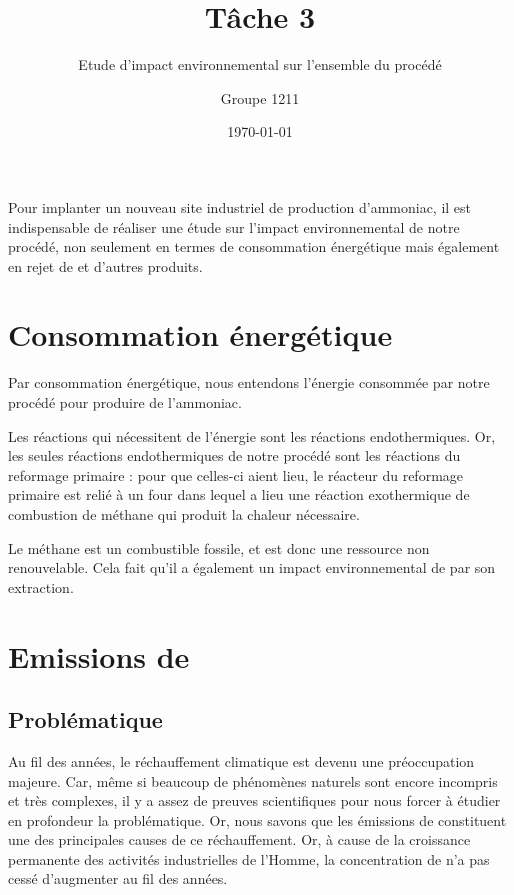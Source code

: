 \documentclass[a4paper, oneside]{scrartcl}
\begin{document}
\titlehead{}
\subject{}
\title{Tâche 3}
\subtitle{ Etude d’impact environnemental sur l’ensemble du procédé }
\author{Groupe 1211}
\publishers{}
\date{\today}

\dedication{}

\maketitle

Pour implanter un nouveau site industriel de production d'ammoniac, il est indispensable de réaliser une étude sur l'impact environnemental de notre procédé, non seulement en termes de consommation énergétique mais également en rejet de  et d'autres produits.

\section{Consommation énergétique}
Par consommation énergétique, nous entendons l'énergie consommée par notre procédé pour produire de l'ammoniac.
 

Les réactions qui nécessitent de l'énergie sont les réactions endothermiques. Or, les seules réactions endothermiques de notre procédé sont les réactions du reformage primaire : pour que celles-ci aient lieu, le réacteur du reformage primaire est relié à un four dans lequel a lieu une réaction exothermique de combustion de méthane qui produit la chaleur nécessaire.
 

Le méthane est un combustible fossile, et est donc une ressource non renouvelable. Cela fait qu'il a également un impact environnemental de par son extraction.

\section{Emissions de \texorpdfstring{}{CO \texttwoinferior}}
\subsection{Problématique \cite{prob1} \cite{changclim}}
Au fil des années, le réchauffement climatique est devenu une préoccupation majeure. Car, même si beaucoup de phénomènes naturels sont encore incompris et très complexes, il y a assez de preuves scientifiques pour nous forcer à étudier en profondeur la problématique. Or, nous savons que les émissions de  constituent une des principales causes de ce réchauffement.
Or, à cause de la croissance permanente des activités industrielles de l'Homme, la concentration de  n'a pas cessé d'augmenter au fil des années.
\end{document}
